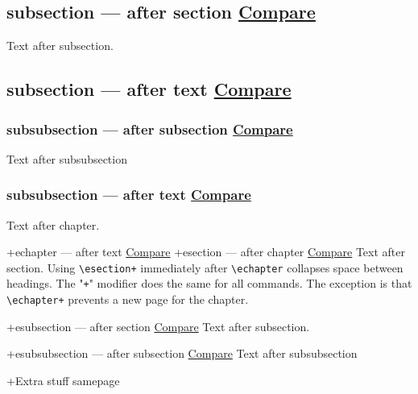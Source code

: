 \documentclass[12pt,a4paper,oneside,notitlepage]{report}
\begin{document}
\subsection*{subsection --- after section \hyperref[esubplus]{Compare}}\label{subplus}
Text after subsection.

\subsection*{subsection --- after text \hyperref[esubs]{Compare}}\label{sub}
\subsubsection*{subsubsection --- after subsection \hyperref[esubsubplus]{Compare}}\label{subsubplus}
Text after subsubsection

\subsubsection*{subsubsection --- after text \hyperref[esubsub]{Compare}}\label{subsub}

\label{echapter}
Text after chapter.

\echapter*+{echapter --- after text \hyperref[chapterplus]{Compare}}\label{echapterplus}
\esection*+{esection --- after chapter \hyperref[sectionplus]{Compare}}\label{esectionplus}
Text after section. {\color{blue} Using \verb|\esection+| immediately after \verb|\echapter| collapses space between headings. The "\verb|+|" modifier does the same for all commands. The exception is that \verb|\echapter+| prevents a new page for the chapter.}

\label{esection}
\esubsection*+{esubsection --- after section \hyperref[subplus]{Compare}}\label{esubplus}
Text after subsection.

\label{esub}
\esubsubsection*+{esubsubsection --- after subsection \hyperref[subsubplus]{Compare}}\label{esubsubplus}
Text after subsubsection

\label{esubsub}

\eappendix+{Extra stuff samepage}
\end{document}
